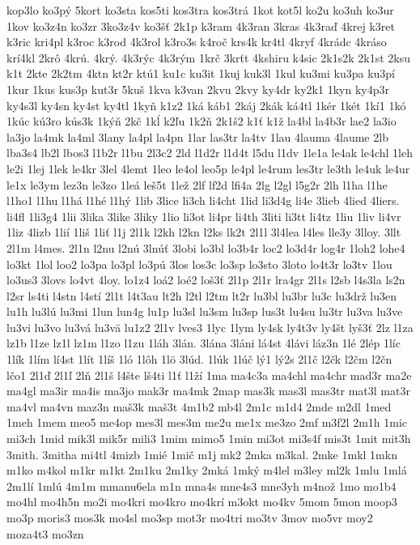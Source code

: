 {kop3lo
ko3pý
5kort
ko3sta
kos5ti
kos3tra
kos3trá
1kot
kot5l
ko2u
ko3uh
ko3ur
1kov
ko3z4n
ko3zr
3ko3z4v
ko3šť
2k1p
k3ram
4k3ran
3kras
4k3raď
4krej
k3ret
k3ric
kri4pl
k3roc
k3rod
4k3rol
k3ro3s
k4roč
krs4k
kr4tl
4kryf
4krádc
4kráso
krí4kl
2krô
4krú.
4krý.
4k3rýc
4k3rým
1krč
3krťt
4kshiru
k4sic
2k1s2k
2k1st
2ksu
k1t
2kte
2k2tm
4ktn
kt2r
ktú1
ku1c
ku3it
1kuj
kuk3l
1kul
ku3mi
ku3pa
ku3pí
1kur
1kus
kus3p
kut3r
5kuš
1kva
k3van
2kvu
2kvy
ky4dr
ky2k1
1kyn
ky4p3r
ky4s3l
ky4sn
ky4st
ky4tl
1kyň
k1z2
1ká
káb1
2káj
2kák
ká4tl
1kér
1két
1kí1
1kó
1kúc
kú3ro
kús3k
1kýň
2kč
1kĺ
k2ľu
1k2ň
2k1š2
k1ť
k1ž
la4bl
la4b3r
lae2
la3io
la3jo
la4mk
la4ml
3lany
la4pl
la4pn
1lar
las3tr
la4tv
1lau
4lauma
4laume
2lb
lba3s4
lb2l
lbos3
l1b2r
l1bu
2l3c2
2ld
l1d2r
l1d4t
l5du
l1dv
1le1a
le4ak
le4chl
1leh
le2i
1lej
1lek
le4kr
3lel
4lemt
1leo
le4ol
leo5p
le4pl
le4rum
les3tr
le3th
le4uk
le4ur
le1x
le3ym
lez3n
le3zo
1leá
leš5t
1lež
2lf
lf2d
lfi4a
2lg
l2gl
l5g2r
2lh
l1ha
l1he
l1ho1
l1hu
l1há
l1hé
l1hý
1lib
3lice
li3ch
li4cht
1lid
li3d4g
li4e
3lieb
4lied
4liers.
li4fl
1li3g4
1lii
3lika
3like
3liky
1lio
li3ot
li4pr
li4th
3liti
li3tt
li4tz
1liu
1liv
li4vr
1liz
4lizb
1lií
1liš
1liť
l1j
2l1k
l2kh
l2kn
l2ks
lk2t
2l1l
3l4lea
l4les
lle3y
3lloy.
3llt
2l1m
l4mes.
2l1n
l2nu
l2nú
3lnúť
3lobi
lo3bl
lo3b4r
loc2
lo3d4r
log4r
1loh2
lohe4
lo3kt
1lol
loo2
lo3pa
lo3pl
lo3pú
3los
los3c
lo3sp
lo3sto
3loto
lo4t3r
lo3tv
1lou
lo3us3
3lovs
lo4vt
4loy.
lo1z4
loá2
loé2
loš3ť
2l1p
2l1r
lra4gr
2l1s
l2sb
l4s3la
ls2n
l2sr
ls4ti
l4stn
l4stí
2l1t
l4t3au
lt2h
l2tl
l2tm
lt2r
lu3bl
lu3br
lu3c
lu3drž
lu3en
lu1h
lu3lú
lu3mi
1lun
lun4g
lu1p
lu3sl
lu3sm
lu3sp
lus3t
lu4su
lu3tr
lu3va
lu3ve
lu3vi
lu3vo
lu3vá
lu3vä
lu1z2
2l1v
lves3
1lyc
1lym
ly4sk
ly4t3v
ly4št
lyš3ť
2lz
l1za
lz1b
l1ze
lz1l
lz1m
l1zo
l1zu
1láh
3lán.
3lána
3láni
lá4st
4lávi
láz3n
1lé
2lép
1líc
1lík
1lím
lí4st
1lít
1líš
1ló
1lôh
1lö
3lúd.
1lúk
1lúč
lý1
lý2s
2l1č
l2čk
l2čm
l2čn
lčo1
2l1ď
2l1ľ
2lň
2l1š
l4šte
lš4ti
l1ť
l1ží
1ma
ma4c3a
ma4chl
ma4chr
mad3r
ma2e
ma4gl
ma3ir
ma4is
ma3jo
mak3r
ma4mk
2map
mas3k
mas3l
mas3tr
mat3l
mat3r
ma4vl
ma4vn
maz3n
maš3k
maš3t
4m1b2
mb4l
2m1c
m1d4
2mde
m2dl
1med
1meh
1mem
meo5
me4op
mes3l
mes3m
me2u
me1x
me3zo
2mf
m3f2l
2m1h
1mic
mi3ch
1mid
mik3l
mik5r
mili3
1mim
mimo5
1min
mi3ot
mi3s4f
mis3t
1mit
mit3h
3mith.
3mitha
mi4tl
4mizb
1mié
1mič
m1j
mk2
2mka
m3kal.
2mke
1mkl
1mkn
m1ko
m4kol
m1kr
m1kt
2m1ku
2m1ky
2mká
1mký
m4lel
m3ley
ml2k
1mlu
1mlá
2m1lí
1mlú
4m1m
mmanu6ela
m1n
mna4s
mne4s3
mne3yh
m4nož
1mo
mo1b4
mo4hl
mo4h5n
mo2i
mo4kri
mo4kro
mo4krí
m3okt
mo4kv
5mom
5mon
moop3
mo3p
moris3
mos3k
mo4sl
mo3sp
mot3r
mo4tri
mo3tv
3mov
mo5vr
moy2
moza4t3
mo3zn
}
